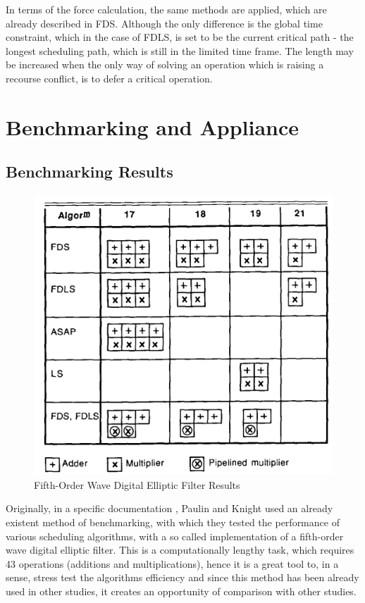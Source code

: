 \documentclass[conference]{IEEEtran}
\begin{document}
In terms of the force calculation, the same methods are applied, which are already described in FDS. Although the only difference is the global time constraint, which in the case of FDLS, is set to be the current critical path - the longest scheduling path, which is still in the limited time frame. The length may be increased when the only way of solving an operation which is raising a recourse conflict, is to defer a critical operation.

\section{Benchmarking and Appliance}

\subsection{Benchmarking Results}

\begin{figure}[htbp]
\centerline{\includegraphics[scale=.5]{Result_Applience.png}}
\caption{Fifth-Order Wave Digital Elliptic Filter Results \cite{b2}}
\label{wavefilter}
\end{figure}

Originally, in a specific documentation \cite{b2}, Paulin and Knight used an already existent method of benchmarking, with which they tested the performance of various scheduling algorithms, with a so called implementation of a fifth-order wave digital elliptic filter. This is a computationally lengthy task, which requires 43 operations (additions and multiplications), hence it is a great tool to, in a sense, stress test the algorithms efficiency and since this method has been already used in other studies, it creates an opportunity of comparison with other studies.
\end{document}

